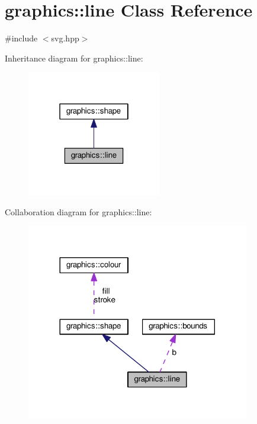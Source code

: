 \hypertarget{classgraphics_1_1line}{}\section{graphics\+:\+:line Class Reference}
\label{classgraphics_1_1line}


{\ttfamily \#include $<$svg.\+hpp$>$}



Inheritance diagram for graphics\+:\+:line\+:
\nopagebreak
\begin{figure}[H]
\begin{center}
\leavevmode
\includegraphics[width=166pt]{classgraphics_1_1line__inherit__graph}
\end{center}
\end{figure}


Collaboration diagram for graphics\+:\+:line\+:
\nopagebreak
\begin{figure}[H]
\begin{center}
\leavevmode
\includegraphics[width=276pt]{classgraphics_1_1line__coll__graph}
\end{center}
\end{figure}
